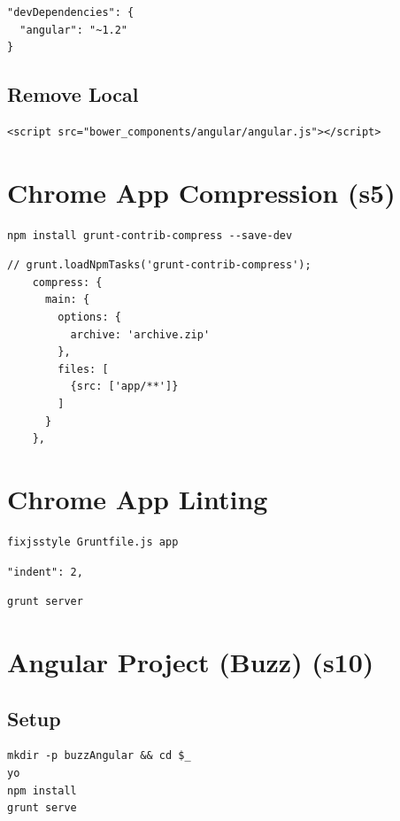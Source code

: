 \documentclass[11pt]{article}
\begin{document}
\begin{verbatim}
"devDependencies": {
  "angular": "~1.2"
}
\end{verbatim}
\subsection*{Remove Local}
\label{sec-8-2}

\begin{verbatim}
<script src="bower_components/angular/angular.js"></script>
\end{verbatim}
\section*{Chrome App Compression (s5)}
\label{sec-9}

\begin{verbatim}
npm install grunt-contrib-compress --save-dev
\end{verbatim}

\begin{verbatim}
// grunt.loadNpmTasks('grunt-contrib-compress');
    compress: {
      main: {
        options: {
          archive: 'archive.zip'
        },
        files: [
          {src: ['app/**']}
        ]
      }
    },
\end{verbatim}
\section*{Chrome App Linting}
\label{sec-10}

\begin{verbatim}
fixjsstyle Gruntfile.js app
\end{verbatim}

\begin{verbatim}
"indent": 2,
\end{verbatim}

\begin{verbatim}
grunt server
\end{verbatim}
\section*{Angular Project (Buzz) (s10)}
\label{sec-11}


\subsection*{Setup}
\label{sec-11-1}

\begin{verbatim}
mkdir -p buzzAngular && cd $_
yo
npm install
grunt serve
\end{verbatim}
\end{document}

